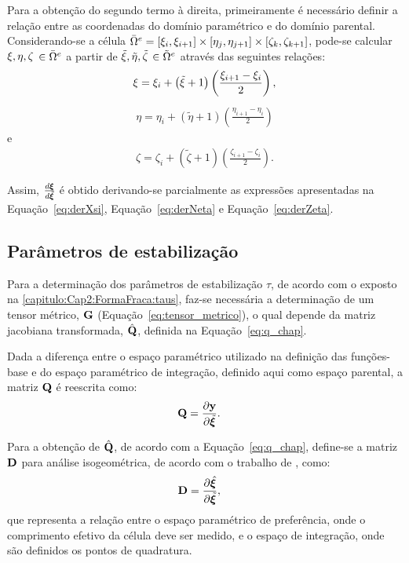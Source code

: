 Para a obtenção do segundo termo à direita, primeiramente é necessário definir a relação entre as coordenadas do domínio paramétrico e do domínio parental. Considerando-se a célula $\bar{\Omega}^{e} = [\xi_{i},\xi_{i+1}] \times [\eta_{j},\eta_{j+1}] \times [\zeta_{k},\zeta_{k+1}]$, pode-se calcular $\xi,\eta, \zeta$ $\in \bar{\Omega}^{e}$ a partir de $\tilde{\xi},\tilde{\eta}, \tilde{\zeta}$ $\in \tilde{\Omega}^{e}$ através das seguintes relações: 
\begin{align}
\xi = \xi_{i} + \left(\tilde{\xi}+1\right) \left(\frac{\xi_{i+1}-\xi_{i}}{2}\right), \label{eq:derXsi}
\end{align}
\begin{align}
\eta = \eta_{i} + \left(\tilde{\eta}+1\right) \left(\frac{\eta_{i+1}-\eta_{i}}{2}\right) \label{eq:derNeta}
\end{align}
\noindent e
\begin{align}
\zeta = \zeta_{i} + \left(\tilde{\zeta}+1\right) \left(\frac{\zeta_{i+1}-\zeta_{i}}{2}\right). \label{eq:derZeta}
\end{align}

Assim, $\frac{d\bm{\xi}}{d\tilde{\bm{\xi}}}$ é obtido derivando-se parcialmente as expressões apresentadas na Equação~\eqref{eq:derXsi}, Equação~\eqref{eq:derNeta} e Equação~\eqref{eq:derZeta}.

\subsection{Parâmetros de estabilização}\label{capitulo:Cap3:RepreGeo:taus2}

Para a determinação dos parâmetros de estabilização $\tau$, de acordo com o exposto na  \autoref{capitulo:Cap2:FormaFraca:taus}, faz-se necessária a determinação de um tensor métrico, $\mathbf{G}$ (Equação~\eqref{eq:tensor_metrico}), o qual depende da matriz jacobiana transformada, $\hat{\mathbf{Q}}$, definida na Equação~\eqref{eq:q_chap}.

Dada a diferença entre o espaço paramétrico utilizado na definição das funções-base e do espaço paramétrico de integração, definido aqui como espaço parental, a matriz $\mathbf{Q}$ é reescrita como:
\begin{align}
	\mathbf{Q}&=\frac{\partial\mathbf{y}}{\partial\tilde{\bm{\xi}}}.
\end{align}

Para a obtenção de $\hat{\mathbf{Q}}$, de acordo com a Equação~\eqref{eq:q_chap}, define-se a matriz $\mathbf{D}$ para análise isogeométrica, de acordo com o trabalho de , como:
\begin{align}
	\mathbf{D}&=\frac{\partial\hat{\bm{\xi}}}{\partial\tilde{\bm{\xi}}},
\end{align}
\noindent que representa a relação entre o espaço paramétrico de preferência, onde o comprimento efetivo da célula deve ser medido, e o espaço de integração, onde são definidos os pontos de quadratura.

